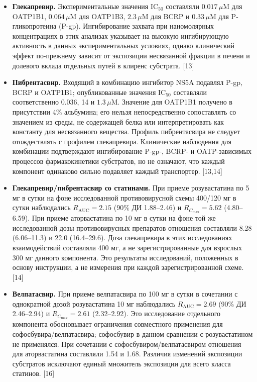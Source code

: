 \documentclass[11pt]{article}
\begin{document}
\begin{itemize}
\item \textbf{Глекапревир.} Экспериментальные значения \(\mathrm{IC}_{50}\) составляли \(0.017\,\mu\mathrm{M}\) для OATP1B1, \(0.064\,\mu\mathrm{M}\) для OATP1B3, \(2.3\,\mu\mathrm{M}\) для BCRP и \(0.33\,\mu\mathrm{M}\) для P-гликопротеина (P-gp). Ингибирование захвата при наномолярных концентрациях в этих анализах указывает на высокую ингибирующую активность в данных экспериментальных условиях, однако клинический эффект по-прежнему зависит от экспозиции несвязанной фракции в печени и долевого вклада отдельных путей в клиренс субстрата. [13]
\item \textbf{Пибрентасвир.} Входящий в комбинацию ингибитор NS5A подавлял P-gp, BCRP и OATP1B1; опубликованные значения \(\mathrm{IC}_{50}\) составляли соответственно 0.036, 14 и \(1.3\,\mu\mathrm{M}\). Значение для OATP1B1 получено в присутствии 4\% альбумина; его нельзя непосредственно сопоставлять со значением из среды, не содержащей белка или интерпретировать как константу для несвязанного вещества. Профиль пибрентасвира не следует отождествлять с профилем глекапревира. Клинические наблюдения для комбинации подтверждают ингибирование P-gp-, BCRP- и OATP-зависимых процессов фармакокинетики субстратов, но не означают, что каждый компонент одинаково сильно подавляет каждый транспортер. [13,14]
\item \textbf{Глекапревир/пибрентасвир со статинами.} При приеме розувастатина по 5 мг в сутки на фоне исследованной противовирусной схемы 400/120 мг в сутки наблюдались \(R_{\mathrm{AUC}}=2.15\) (90\% ДИ 1.88--2.46) и \(R_{C_{\max}}=5.62\) (4.80--6.59). При приеме аторвастатина по 10 мг в сутки на фоне той же исследованной дозы противовирусных препаратов отношения составляли 8.28 (6.06--11.3) и 22.0 (16.4--29.6). Доза глекапревира в этих исследованиях взаимодействий составляла 400 мг, а не зарегистрированные для взрослых 300 мг данного компонента. Это результаты исследований, положенных в основу инструкции, а не измерения при каждой зарегистрированной схеме. [14]
\item \textbf{Велпатасвир.} При приеме велпатасвира по 100 мг в сутки в сочетании с однократной дозой розувастатина 10 мг наблюдались \(R_{\mathrm{AUC}}=2.69\) (90\% ДИ 2.46--2.94) и \(R_{C_{\max}}=2.61\) (2.32--2.92). Это исследование отдельного компонента обосновывает ограничения совместного применения для софосбувира/велпатасвира; софосбувир в данном сравнении с розувастатином не применялся. При сочетании с софосбувиром/велпатасвиром отношения для аторвастатина составляли 1.54 и 1.68. Различия изменений экспозиции субстратов исключают единый множитель экспозиции для всего класса статинов. [16]

\end{itemize}
\end{document}
